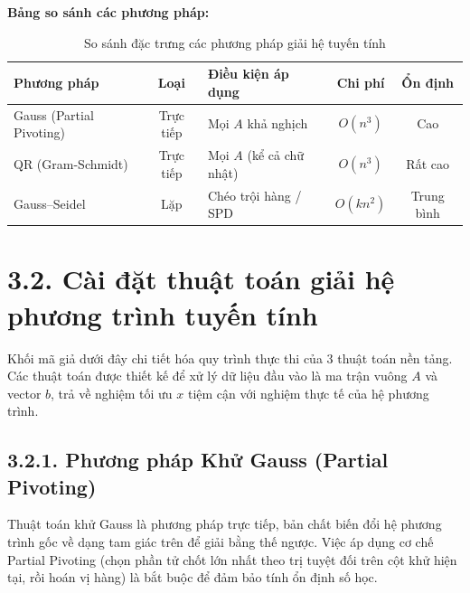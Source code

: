 \textbf{Bảng so sánh các phương pháp:}
\begin{table}[H]
    \centering
    \caption{So sánh đặc trưng các phương pháp giải hệ tuyến tính}
    \vspace{0.2cm}
    \renewcommand{\arraystretch}{1.2}
    \begin{tabular}{|l|c|l|c|c|}
    \hline
    \textbf{Phương pháp} & \textbf{Loại} & \textbf{Điều kiện áp dụng} & \textbf{Chi phí} & \textbf{Ổn định} \\ \hline
    Gauss (Partial Pivoting) & Trực tiếp & Mọi $A$ khả nghịch & $O(n^3)$ & Cao \\ \hline
    QR (Gram-Schmidt) & Trực tiếp & Mọi $A$ (kể cả chữ nhật) & $O(n^3)$ & Rất cao \\ \hline
    Gauss--Seidel & Lặp & Chéo trội hàng / SPD & $O(k n^2)$ & Trung bình \\ \hline
    \end{tabular}
\end{table}

\section*{3.2. Cài đặt thuật toán giải hệ phương trình tuyến tính}
{}

Khối mã giả dưới đây chi tiết hóa quy trình thực thi của 3 thuật toán nền tảng. Các thuật toán được thiết kế để xử lý dữ liệu đầu vào là ma trận vuông $A$ và vector $b$, trả về nghiệm tối ưu $x$ tiệm cận với nghiệm thực tế của hệ phương trình.

\subsection*{3.2.1. Phương pháp Khử Gauss (Partial Pivoting)}
{}

Thuật toán khử Gauss là phương pháp trực tiếp, bản chất biến đổi hệ phương trình gốc về dạng tam giác trên để giải bằng thế ngược. Việc áp dụng cơ chế Partial Pivoting (chọn phần tử chốt lớn nhất theo trị tuyệt đối trên cột khử hiện tại, rồi hoán vị hàng) là bắt buộc để đảm bảo tính ổn định số học.

